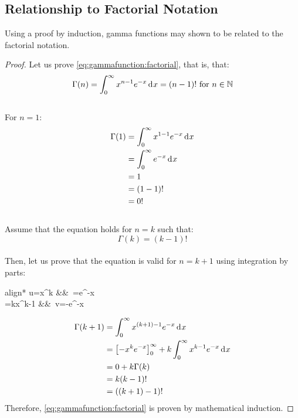 \documentclass[12pt]{article}
\begin{document}

\pagebreak
\subsection{Relationship to Factorial Notation}
Using a proof by induction, gamma functions may shown to be related to the factorial notation.
\begin{proof}
	Let us prove \autoref{eq:gammafunction:factorial}, that is, that:\\[-12pt]
	\begin{equation}
		\Gamma(n) = \int^\infty_0 x^{n-1}e^{-x}\mathop{}\!\mathrm{d^{}}x = (n-1)!\text{ for }n\in\mathbb{N}
	\end{equation}\\[-24pt]
	For $n=1$:\\[-12pt]
	\begin{equation}
		\begin{split}
			\Gamma(1)	&=	\int^\infty_0 x^{1-1}e^{-x}\mathop{}\!\mathrm{d^{}}x\\
						&=	\int^\infty_0 e^{-x}\mathop{}\!\mathrm{d^{}}x\\
						&=	1\\
						&=	(1-1)!\\
						&=	0!
		\end{split}
	\end{equation}\\[-24pt]
	Assume that the equation holds for $n=k$ such that:\\[-12pt]
	\begin{equation}
		\Gamma(k) = (k-1)!
	\end{equation}\\[-24pt]
	Then, let us prove that the equation is valid for $n=k+1$ using integration by parts:\\[-12pt]
	\begin{empheq}[box=\widefbox]{align*}
		u=x^{k}						&&\,	=e^{-x}\\
		=kx^{k-1}	&&\,	v=-e^{-x}
	\end{empheq}
	\begin{equation}
		\begin{split}
			\Gamma(k+1)	&=	\int^\infty_0 x^{(k+1)-1}e^{-x}\mathop{}\!\mathrm{d^{}}x\\
						&=	\left[-x^k e^{-x}\right]^\infty_0 + k\int^\infty_0 x^{k-1}e^{-x}\mathop{}\!\mathrm{d^{}}x\\
						&=	0 +k\Gamma(k)\\
						&=	k(k-1)!\\
						&=	((k+1)-1)!
		\end{split}
	\end{equation}
	Therefore, \autoref{eq:gammafunction:factorial} is proven by mathematical induction.
\end{proof}
\end{document}
